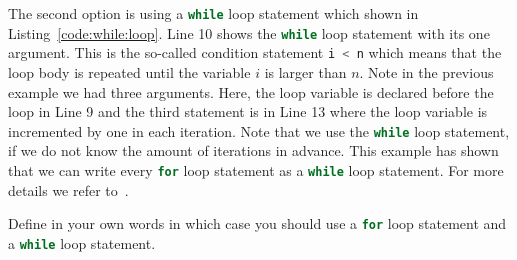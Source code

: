 

The second option is using a \lstinline[language=C++]|while| loop statement which shown in Listing~\ref{code:while:loop}. Line 10 shows the \lstinline[language=C++]|while| loop statement with its one argument. This is the so-called condition statement  \lstinline[language=C++]{i < n} which means that the loop body is repeated until the variable $i$ is larger than $n$. Note in the previous example we had three arguments. Here, the loop variable is declared before the loop in Line 9 and the third statement is  in Line 13 where the loop variable is incremented by one in each iteration. Note that we use the \lstinline[language=C++]|while| loop statement, if we do not know the amount of iterations in advance. This example has shown that we can write every \lstinline[language=C++]|for| loop statement as a \lstinline[language=C++]|while| loop statement. For more details we refer to~\cite[Chapter~2]{andrew2000accelerated}.   




\begin{exercise}
Define in your own words in which case you should use a \lstinline[language=C++]|for| loop statement and a \lstinline[language=C++]|while| loop statement. 
\end{exercise}


